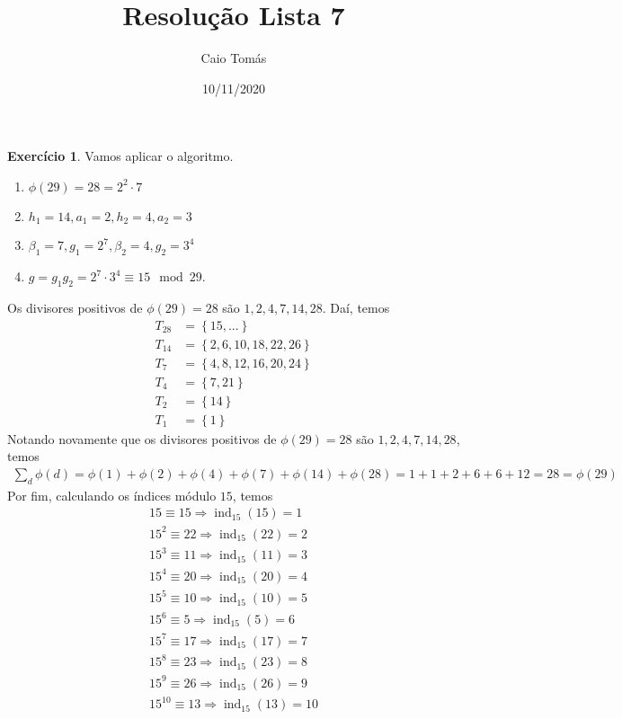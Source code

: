 \documentclass[a4paper,12pt]{article}
\title{Resolução Lista 7}
\date{10/11/2020}
\author{Caio Tomás}
\DeclareMathOperator{\ind}{ind}
\theoremstyle{definition}
\newtheorem{exercise}{Exercício}%
\begin{document}
	\maketitle
	\begin{exercise}
		Vamos aplicar o algoritmo.
		\begin{enumerate}[(1)]
			\item $\phi(29) = 28 = 2^2\cdot 7$
			\item $h_1 = 14, a_1 = 2, h_2 = 4, a_2 = 3$
			\item $\beta_1 = 7, g_1 = 2^7, \beta_2 = 4, g_2 = 3^4$
			\item $g = g_1g_2 = 2^7\cdot 3^4\equiv 15\mod 29$.
		\end{enumerate}
	Os divisores positivos de $\phi(29) = 28$ são $1,2,4,7,14,28$. Daí, temos
	\begin{align*}
	T_{28} &= \left\{ 15,... \right\} \\
	T_{14} &= \left\{ 2,6,10,18,22,26 \right\} \\
	T_{7} &= \left\{ 4,8,12,16,20,24 \right\} \\
	T_{4} &= \left\{ 7,21 \right\} \\
	T_{2} &= \left\{ 14 \right\} \\
	T_{1} &= \left\{ 1 \right\}
	\end{align*}
	Notando novamente que os divisores positivos de $\phi(29) = 28$ são $1,2,4,7,14,28$, temos
	\begin{align*}
	\sum_d\phi(d) = \phi(1) + \phi(2) + \phi(4) + \phi(7) + \phi(14) + \phi(28) = 1+1+2+6+6+12 = 28 = \phi(29)
	\end{align*}
	Por fim, calculando os índices módulo $15$, temos
	\begin{align*}
	15\equiv 15 \Longrightarrow \ind_{15}(15) = 1 \\
	15^2\equiv 22 \Longrightarrow \ind_{15}(22) = 2 \\
	15^3\equiv 11 \Longrightarrow \ind_{15}(11) = 3 \\
	15^4\equiv 20 \Longrightarrow \ind_{15}(20) = 4 \\
	15^5\equiv 10 \Longrightarrow \ind_{15}(10) = 5 \\
	15^6\equiv 5 \Longrightarrow \ind_{15}(5) = 6\\
	15^7\equiv 17 \Longrightarrow \ind_{15}(17) = 7 \\
	15^8\equiv 23 \Longrightarrow \ind_{15}(23) = 8 \\
	15^9\equiv 26 \Longrightarrow \ind_{15}(26) = 9 \\
	15^{10}\equiv 13 \Longrightarrow \ind_{15}(13) = 10 \\

\end{align*}
\end{exercise}
\end{document}
